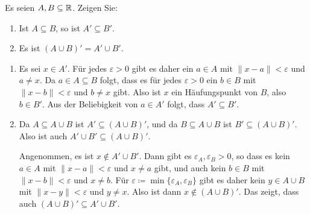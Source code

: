 \documentclass[a4paper,10pt]{article}
\begin{document}
\begin{question}
 Es seien $A, B \subseteq \mathbb{R}$. Zeigen Sie:
 \begin{enumerate}
  \item
   Ist $A \subseteq B$, so ist $A' \subseteq B'$.
  \item
   Es ist $(A \cup B)' = A' \cup B'$.
 \end{enumerate}
\end{question}
\begin{solution}
 \begin{enumerate}
  \item
   Es sei $x \in A'$. Für jedes $\varepsilon > 0$ gibt es daher ein $a \in A$ mit $\|x-a\| < \varepsilon$ und $a \neq x$. Da $a \in A \subseteq B$ folgt, dass es für jedes $\varepsilon > 0$ ein $b \in B$ mit $\|x-b\| < \varepsilon$ und $b \neq x$ gibt. Also ist $x$ ein Häufungspunkt von $B$, also $b \in B'$. Aus der Beliebigkeit von $a \in A'$ folgt, dass $A' \subseteq B'$.
  \item
   Da $A \subseteq A \cup B$ ist $A' \subseteq (A \cup B)'$, und da $B \subseteq A \cup B$ ist $B' \subseteq (A \cup B)'$. Also ist auch $A' \cup B' \subseteq (A \cup B)'$.
   
   Angenommen, es ist $x \notin A' \cup B'$. Dann gibt es $\varepsilon_A, \varepsilon_B > 0$, so dass es kein $a \in A$ mit $\|x-a\| < \varepsilon$ und $x \neq a$ gibt, und auch kein $b \in B$ mit $\|x-b\| < \varepsilon$ und $x \neq b$. Für $\varepsilon \coloneqq \min\{\varepsilon_A, \varepsilon_B\}$ gibt es daher kein $y \in A \cup B$ mit $\|x-y\| < \varepsilon$ und $y \neq x$. Also ist dann $x \notin (A \cup B)'$. Das zeigt, dass auch $(A \cup B)' \subseteq A' \cup B'$.
  \qedhere
 \end{enumerate}
\end{solution}
\end{document}
